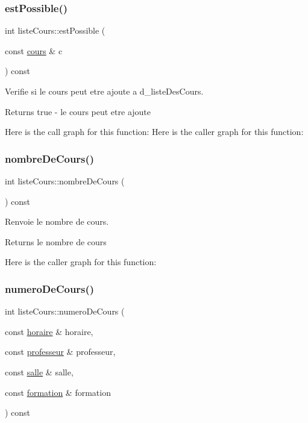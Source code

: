 \subsubsection{\texorpdfstring{est\+Possible()}{estPossible()}}
{\footnotesize\ttfamily int liste\+Cours\+::est\+Possible (\begin{DoxyParamCaption}\item[{const \hyperlink{classcours}{cours} \&}]{c }\end{DoxyParamCaption}) const}



Verifie si le cours peut etre ajoute a d\+\_\+liste\+Des\+Cours. 

\begin{DoxyReturn}{Returns}
true -\/ le cours peut etre ajoute 
\end{DoxyReturn}
Here is the call graph for this function\+:
Here is the caller graph for this function\+:
\hypertarget{classliste_cours_a34b859c2380770eb560c0a6dcf01cc81}{}\label{classliste_cours_a34b859c2380770eb560c0a6dcf01cc81} 
\subsubsection{\texorpdfstring{nombre\+De\+Cours()}{nombreDeCours()}}
{\footnotesize\ttfamily int liste\+Cours\+::nombre\+De\+Cours (\begin{DoxyParamCaption}{ }\end{DoxyParamCaption}) const}



Renvoie le nombre de cours. 

\begin{DoxyReturn}{Returns}
le nombre de cours 
\end{DoxyReturn}
Here is the caller graph for this function\+:
\hypertarget{classliste_cours_a71e0b3dd96c917afdb8206a43b0f83bd}{}\label{classliste_cours_a71e0b3dd96c917afdb8206a43b0f83bd} 
\subsubsection{\texorpdfstring{numero\+De\+Cours()}{numeroDeCours()}}
{\footnotesize\ttfamily int liste\+Cours\+::numero\+De\+Cours (\begin{DoxyParamCaption}\item[{const \hyperlink{classhoraire}{horaire} \&}]{horaire,  }\item[{const \hyperlink{classprofesseur}{professeur} \&}]{professeur,  }\item[{const \hyperlink{classsalle}{salle} \&}]{salle,  }\item[{const \hyperlink{classformation}{formation} \&}]{formation }\end{DoxyParamCaption}) const}



